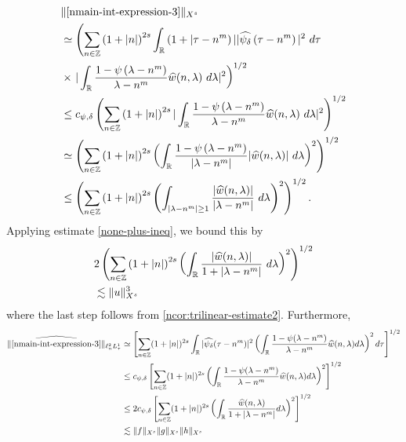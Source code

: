 \begin{equation}
  \label{niu}
	\begin{split}
		& \| \eqref{nmain-int-expression-3} \|_{X^s} 
		\\
		& \simeq \left( \sum_{n \in \zz} \left (1 + |n| \right )^{2s} \int_\rr \left( 1 + | \tau - n^{m
    } \right ) | | \wh{\psi_{\delta}}\left( \tau - n^{m } \right) |^2 \ d \tau
		\right.
		\\
		& \times \left . |
		\int_\rr \frac{1 - \psi\left( \lambda - n^{m } \right)}{\lambda -
		n^{m }} \wh{w}(n, \lambda) \ d \lambda |^2  \right)^{1/2}
		\\
    & \le c_{\psi, \delta}\left( \sum_{n \in \zz} \left (1 + |n| \right )^{2s} | \int_\rr
		\frac{1 - \psi\left( \lambda - n^{m } \right)}{\lambda - n^{m }}
		\wh{w}(n, \lambda) \ d\lambda |^2 \right)^{1/2}
		\\
		& \simeq \left( \sum_{n \in \zz} \left (1 + |n| \right )^{2s}  \left ( \int_\rr
		\frac{1 - \psi\left( \lambda - n^{m } \right)}{|\lambda - n^{m }|}
		|\wh{w}(n, \lambda) | \ d\lambda \right )^2 \right)^{1/2}
		\\
		& \le \left( \sum_{n \in \zz} \left (1 + |n| \right )^{2s}  \left ( \int_{| \lambda - 
		n^{m } | \ge 1}
		\frac{|\wh{w}(n, \lambda) | }{|\lambda - n^{m }|}
		\ d\lambda \right )^2 \right)^{1/2}.
	\end{split}
\end{equation}
%
%
Applying estimate \eqref{none-plus-ineq}, we bound this by
%
\begin{equation}
	\label{nmain-int3-est-X-s-part}
	\begin{split}
		& 2 \left( \sum_{n \in \mathbb{Z}} \left (1 + |n| \right )^{2s}  \left ( \int_{\mathbb{R}}
		\frac{|\widehat{w}(n, \lambda)| }{1 + |\lambda - n^{m }|}
		 \ d\lambda \right )^2 \right)^{1/2}
		 \\
		& \lesssim \|u\|_{X^s}^3
	\end{split}
\end{equation}
%
where the last step follows from \cref{ncor:trilinear-estimate2}.
Furthermore, 
%
%
\begin{equation}
	\label{nmain-int-estimate-3-Y-s-part}
	\begin{split}
    \|\widehat{\eqref{nmain-int-expression-3}}\|_{\ell^{2}_{n}L^{1}_{\tau}}
		& \simeq \left[ \sum_{n \in \mathbb{Z}} (1 + | n |)^{2s} \int_{\mathbb{R}} |
    \widehat{\psi_{\delta}}(\tau - n^{m}) |^{2} \left( \int_{\mathbb{R}}\frac{1 - \psi(\lambda -
		n^{m})}{\lambda - n^{m}} \widehat{w}(n, \lambda) d \lambda \right)^{2} d \tau
		\right]^{1/2}
		\\
		& \le c_{\psi, \delta} \left[ \sum_{n \in \mathbb{Z}} (1 + | n |)^{2s} \left(
		\int_{\mathbb{R}} \frac{1 - \psi(\lambda - n^{m})}{\lambda - n^{m}}
		\widehat{w}(n, \lambda) d \lambda
		\right)^{2}\right]^{1/2}
		\\
		& \le 2 c_{\psi, \delta} \left[ \sum_{n \in \mathbb{Z}} (1 + | n |)^{2s} \left(
		\int_{\mathbb{R}} \frac{\widehat{w}(n, \lambda) }{1 + |\lambda - n^{m}|}
		d \lambda
		\right)^{2}\right]^{1/2}
		\\
		& \lesssim \|f\|_{X^s} \|g\|_{X^s} \|h\|_{X^s}
	\end{split}
\end{equation}
